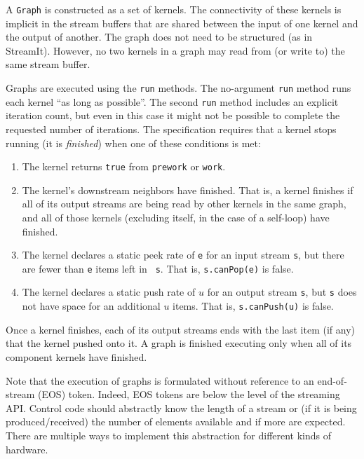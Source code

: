 A {\tt Graph} is constructed as a set of kernels.  The connectivity of these kernels is
implicit in the stream buffers that are shared between the input of one kernel and the output
of another.  The graph does not need to be structured (as in StreamIt).  However, no two
kernels in a graph may read from (or write to) the same stream buffer.

Graphs are executed using the {\tt run} methods.  The no-argument {\tt run} method runs each
kernel ``as long as possible''.  The second {\tt run} method includes an explicit iteration
count, but even in this case it might not be possible to complete the requested number of
iterations.  The specification requires that a kernel stops running (it is {\it finished}) when
one of these conditions is met:
\begin{enumerate}

\item The kernel returns {\tt true} from {\tt prework} or {\tt work}.

\item The kernel's downstream neighbors have finished.  That is, a
kernel finishes if all of its output streams are being read by other
kernels in the same graph, and all of those kernels (excluding itself,
in the case of a self-loop) have finished.

\item The kernel declares a static peek rate of {\tt e} for an input
stream {\tt s}, but there are fewer than {\tt e} items left in {\tt
s}.  That is, {\tt s.canPop(e)} is false.

\item The kernel declares a static push rate of $u$ for an output
stream {\tt s}, but {\tt s} does not have space for an additional $u$
items.  That is, {\tt s.canPush(u)} is false.

\end{enumerate}
Once a kernel finishes, each of its output streams ends with the last item (if any) that the
kernel pushed onto it.  A graph is finished executing only when all of its component kernels
have finished.

Note that the execution of graphs is formulated without reference to
an end-of-stream (EOS) token.  Indeed, EOS tokens are below the level
of the streaming API.  Control code should abstractly know the length
of a stream or (if it is being produced/received) the number of
elements available and if more are expected.  There are multiple ways
to implement this abstraction for different kinds of hardware.

